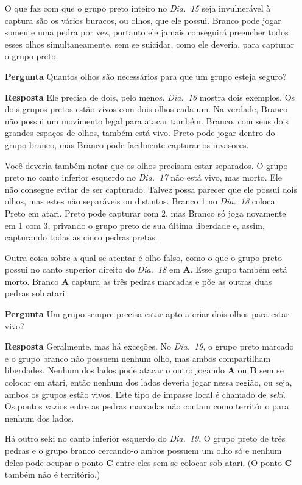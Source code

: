 \begin{itemize}
      O que faz com que o grupo preto inteiro no \emph{Dia.\@~15} seja invulnerável à captura são os vários buracos, ou olhos, que ele possui. Branco pode jogar somente uma pedra por vez, portanto ele jamais conseguirá preencher todos esses olhos simultaneamente, sem se suicidar, como ele deveria, para capturar o grupo preto.
    \item[\textbf{Pergunta}]
      Quantos olhos são necessários para que um grupo esteja seguro?
    \item[\textbf{Resposta}] 
      Ele precisa de dois, pelo menos. \emph{Dia.\@~16} mostra dois exemplos. Os dois grupos pretos estão vivos com dois olhos cada um. Na verdade, Branco não possui um movimento legal para atacar também. Branco, com seus dois grandes espaços de olhos, também está vivo. Preto pode jogar dentro do grupo branco, mas Branco pode facilmente capturar os invasores.

      Você deveria também notar que os olhos precisam estar separados. O grupo preto no canto inferior esquerdo no \emph{Dia.\@~17} não está vivo, mas morto. Ele não consegue evitar de ser capturado. Talvez possa parecer que ele possui dois olhos, mas estes não separáveis ou distintos. Branco 1 no \emph{Dia.\@~18} coloca Preto em atari. Preto pode capturar com 2, mas Branco só joga novamente em 1 com 3, privando o grupo preto de sua última liberdade e, assim, capturando todas as cinco pedras pretas.

      Outra coisa sobre a qual se atentar é olho falso, como o que o grupo preto possui no canto superior direito do \emph{Dia.\@~18} em \textbf{A}. Esse grupo também está morto. Branco \textbf{A} captura as três pedras marcadas e põe as outras duas pedras sob atari.
    \item[\textbf{Pergunta}]
      Um grupo sempre precisa estar apto a criar dois olhos para estar vivo?
    \item[\textbf{Resposta}] 
      Geralmente, mas há exceções. No \emph{Dia.\@~19}, o grupo preto marcado e o grupo branco não possuem nenhum olho, mas ambos compartilham liberdades. Nenhum dos lados pode atacar o outro jogando \textbf{A} ou \textbf{B} sem se colocar em atari, então nenhum dos lados deveria jogar nessa região, ou seja, ambos os grupos estão vivos. Este tipo de impasse local é chamado de \emph{seki}. Os pontos vazios entre as pedras marcadas não contam como território para nenhum dos lados.

      Há outro seki no canto inferior esquerdo do \emph{Dia.\@~19}. O grupo preto de três pedras e o grupo branco cercando-o ambos possuem um olho só e nenhum deles pode ocupar o ponto \textbf{C} entre eles sem se colocar sob atari. (O ponto \textbf{C} também não é território.)
\end{itemize}

